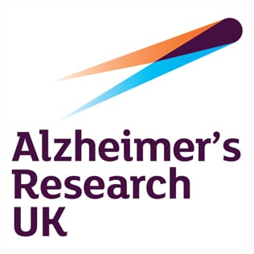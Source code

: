 \documentclass[portrait,a0,final,20pt]{a0poster}
\begin{document}
\begin{multicols}{2}
\hspace{0.5em}
\includegraphics[height=\heightLogos]{aruk_logo} 
\hspace{0.5em}




\end{multicols}
\end{document}
